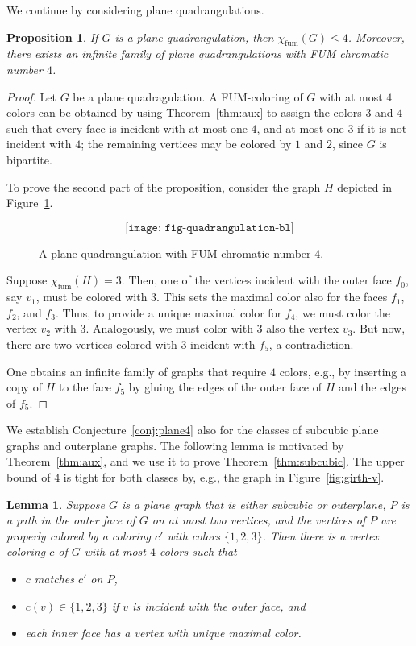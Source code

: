 \documentclass[a4paper,12pt]{article}
\newtheorem{lemma}{Lemma}
\newtheorem{proposition}{Proposition}
\newcommand{\chiC}[1]{\chi_{\mathrm{fum}}(#1)}
\begin{document}
We continue by considering plane quadrangulations.
\begin{proposition}
	If $G$ is a plane quadrangulation, then $\chiC{G} \leq 4$.
	Moreover, there exists an infinite family of plane quadrangulations with FUM chromatic number $4$.
\end{proposition}

\begin{proof}
	Let $G$ be a plane quadragulation.
	A FUM-coloring of $G$ with at most $4$ colors can be obtained by using Theorem~\ref{thm:aux} to assign the colors $3$ and $4$
	such that every face is incident with at most one $4$, and at most one $3$ if it is not incident with $4$;
	the remaining vertices may be colored by $1$ and $2$, since $G$ is bipartite.
	
	To prove the second part of the proposition, consider the graph $H$ depicted in Figure~\ref{fig:quadrangulation}.	
	\begin{figure}[ht]
		$$
			\texttt{[image: fig-quadrangulation-bl]}
		$$
		\caption{A plane quadrangulation with FUM chromatic number $4$.}
		\label{fig:quadrangulation}
	\end{figure}
	Suppose $\chiC{H} = 3$. Then, one of the vertices incident with the outer face $f_0$, say $v_1$, must be colored with $3$.
	This sets the maximal color also for the faces $f_1$, $f_2$, and $f_3$. Thus, to provide a unique maximal color for $f_4$,
	we must color the vertex $v_2$ with $3$. Analogously, we must color with $3$ also the vertex $v_3$. 	
	But now, there are two vertices colored with $3$ incident with $f_5$, a contradiction.
	
	One obtains an infinite family of graphs that require $4$ colors, e.g., by inserting a copy of $H$ 
	to the face $f_5$ by gluing the edges of the outer face of $H$ and the edges of $f_5$.
\end{proof}

We establish Conjecture~\ref{conj:plane4} also for the classes of subcubic plane graphs and outerplane graphs.
The following lemma is motivated by Theorem~\ref{thm:aux}, and we use it to prove Theorem~\ref{thm:subcubic}.
The upper bound of $4$ is tight for both classes by, e.g., the graph in Figure~\ref{fig:girth-v}.

\begin{lemma}
	\label{lem:sub}
	Suppose $G$ is a plane graph that is either subcubic or outerplane,
	$P$ is a path in the outer face of $G$ on at most two vertices,
	and the vertices of $P$ are properly colored by a coloring $c'$ with colors $\{1,2,3\}$.
	Then there is a vertex coloring $c$ of $G$ with at most $4$ colors such that
	\begin{itemize}
		\item $c$ matches $c'$ on $P$,
		\item $c(v) \in \{1,2,3\}$ if $v$ is incident with the outer face, and
		\item each inner face has a vertex with unique maximal color.
	\end{itemize}
\end{lemma}
\end{document}
